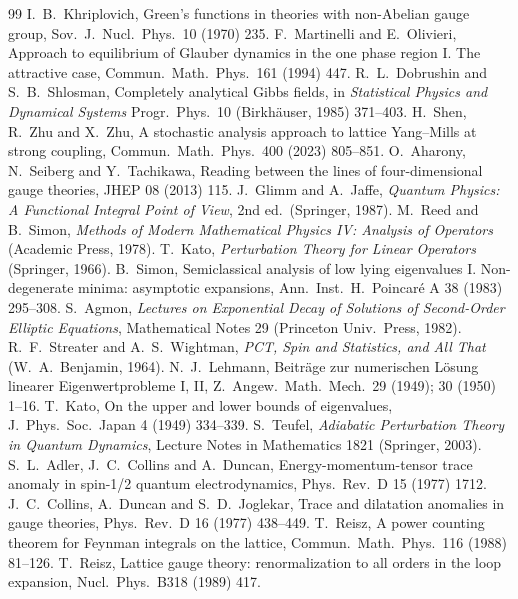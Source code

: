 \begin{thebibliography}{99}
 I.~B.~Khriplovich, Green's functions in theories with non-Abelian gauge group, Sov.\ J.\ Nucl.\ Phys.\ 10 (1970) 235.
 F.~Martinelli and E.~Olivieri, Approach to equilibrium of Glauber dynamics in the one phase region I. The attractive case, Commun.\ Math.\ Phys.\ 161 (1994) 447.
 R.~L.~Dobrushin and S.~B.~Shlosman, Completely analytical Gibbs fields, in \emph{Statistical Physics and Dynamical Systems} Progr.\ Phys.\ 10 (Birkh\"auser, 1985) 371--403.
 H.~Shen, R.~Zhu and X.~Zhu, A stochastic analysis approach to lattice Yang--Mills at strong coupling, Commun.\ Math.\ Phys.\ 400 (2023) 805--851.
 O.~Aharony, N.~Seiberg and Y.~Tachikawa, Reading between the lines of four-dimensional gauge theories, JHEP 08 (2013) 115.
 J.~Glimm and A.~Jaffe, \emph{Quantum Physics: A Functional Integral Point of View}, 2nd ed.\ (Springer, 1987).
 M.~Reed and B.~Simon, \emph{Methods of Modern Mathematical Physics IV: Analysis of Operators} (Academic Press, 1978).
 T.~Kato, \emph{Perturbation Theory for Linear Operators} (Springer, 1966).
 B.~Simon, Semiclassical analysis of low lying eigenvalues I. Non-degenerate minima: asymptotic expansions, Ann.\ Inst.\ H.\ Poincar\'e A 38 (1983) 295--308.
 S.~Agmon, \emph{Lectures on Exponential Decay of Solutions of Second-Order Elliptic Equations}, Mathematical Notes 29 (Princeton Univ.\ Press, 1982).
 R.~F.~Streater and A.~S.~Wightman, \emph{PCT, Spin and Statistics, and All That} (W.~A.~Benjamin, 1964).
 N.~J.~Lehmann, Beitr\"age zur numerischen L\"osung linearer Eigenwertprobleme I, II, Z.\ Angew.\ Math.\ Mech.\ 29 (1949); 30 (1950) 1--16.
 T.~Kato, On the upper and lower bounds of eigenvalues, J.\ Phys.\ Soc.\ Japan 4 (1949) 334--339.
 S.~Teufel, \emph{Adiabatic Perturbation Theory in Quantum Dynamics}, Lecture Notes in Mathematics 1821 (Springer, 2003).
 S.~L.~Adler, J.~C.~Collins and A.~Duncan, Energy-momentum-tensor trace anomaly in spin-1/2 quantum electrodynamics, Phys.\ Rev.\ D 15 (1977) 1712.
 J.~C.~Collins, A.~Duncan and S.~D.~Joglekar, Trace and dilatation anomalies in gauge theories, Phys.\ Rev.\ D 16 (1977) 438--449.
 T.~Reisz, A power counting theorem for Feynman integrals on the lattice, Commun.\ Math.\ Phys.\ 116 (1988) 81--126.
 T.~Reisz, Lattice gauge theory: renormalization to all orders in the loop expansion, Nucl.\ Phys.\ B318 (1989) 417.

\end{thebibliography}
